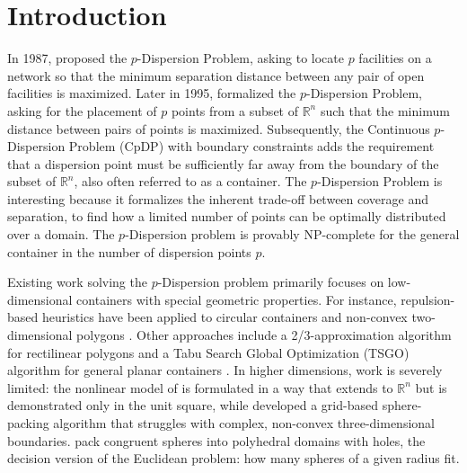 \documentclass[preprint,12pt]{elsarticle}
\theoremstyle{remark}
\def \R {\mathbb{R}}
\begin{document}
\section{Introduction}\label{sec:Intro}

In 1987, \citet{kuby1987} proposed the $p$-Dispersion Problem, asking to locate
$p$ facilities on a network so that the minimum separation distance between any
pair of open facilities is maximized. Later in 1995, \citet{drezner1995}
formalized the $p$-Dispersion Problem, asking for the placement of $p$ points
from a subset of $\R^n$ such that the minimum distance between pairs of points
is maximized. Subsequently, the Continuous $p$-Dispersion Problem (CpDP) with
boundary constraints adds the requirement that a dispersion point must be
sufficiently far away from the boundary of the subset of $\R^n$, also often
referred to as a container. The $p$-Dispersion Problem is interesting because it
formalizes the inherent trade-off between coverage and separation, to find how a
limited number of points can be optimally distributed over a domain. The
$p$-Dispersion problem is provably NP-complete for the general container
\citep{baurfekete2001} in the number of dispersion points $p$.

Existing work solving the $p$-Dispersion problem primarily focuses on
low-dimensional containers with special geometric properties. For instance,
repulsion-based heuristics have been applied to circular containers
\citep{graham1998} and non-convex two-dimensional polygons \citep{dai2021}.
Other approaches include a 2/3-approximation algorithm for rectilinear polygons
\citep{baurfekete2001} and a Tabu Search Global Optimization (TSGO) algorithm
for general planar containers \citep{lai2024}. In higher dimensions, work is
severely limited: the nonlinear model of \citet{drezner1995} is formulated in a
way that extends to $\R^n$ but is demonstrated only in the unit square, while
\citet{kazakov2018} developed a grid-based sphere-packing algorithm that
struggles with complex, non-convex three-dimensional boundaries.
\citet{stoyan2013} pack congruent spheres into polyhedral domains with holes,
the decision version of the Euclidean problem: how many spheres of a given
radius fit.
\end{document}
